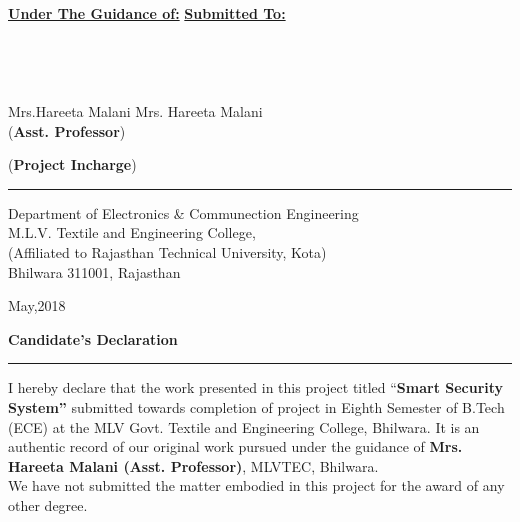 \documentclass[twoside,a4paper,16pt]{book}
\begin{document}
	\vspace{0cm}
	
	
	\Large {\underline{\bf Under The Guidance of:}} \hspace{7.5cm} {\underline{\bf Submitted To:}}\\\\
	\\
	\\
	\\
	\hspace{-1.5cm}Mrs.Hareeta Malani  \hspace{9.4cm} Mrs. Hareeta Malani  \\{\small({\bf Asst. Professor})}\hspace{11cm} {\small({\bf Project Incharge})\\
		
		
		
		
		\begin{center}
			{
				{\rule{190mm}{0.2mm}}
				\small Department of Electronics \& Communection Engineering\\
				M.L.V. Textile and Engineering College,\\(Affiliated to Rajasthan Technical University, Kota)
				\\Bhilwara 311001, Rajasthan
				\vspace{0}
				
				{\small May,2018}
			}
			
		\end{center}
		
		\newpage
		\begin{center}
			\huge{\bf Candidate’s Declaration}\\
			{\rule{185mm}{0.2mm}}
			
		\end{center}
		{\large 
			\vspace{1.5cm}
			I hereby declare that the work presented in this project titled {“\bf Smart Security System”} submitted towards completion of project in Eighth Semester of B.Tech (ECE) at the MLV Govt. Textile and Engineering College, Bhilwara.  It is an authentic record of our original work pursued under the guidance of {\bf Mrs. Hareeta Malani (Asst. Professor)}, MLVTEC, Bhilwara. \\
			We have not submitted the matter embodied in this project for the award of any other degree. \\\vspace{.5cm}\\
			
}}
\end{document}
